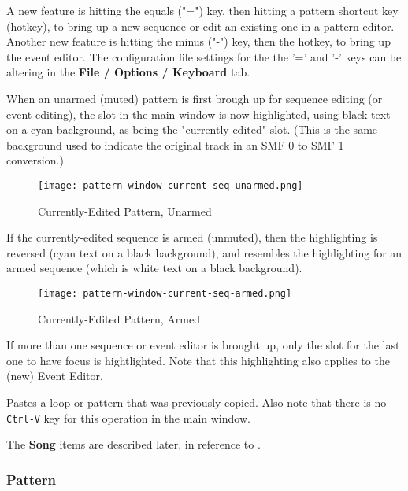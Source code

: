    A new feature is hitting the equals ("=") key, then hitting
   a pattern shortcut key (hotkey), to bring up a new sequence or edit an
   existing one in a pattern editor.  Another new feature is hitting the minus
   ("-") key, then the hotkey, to bring up the event editor.  The
   configuration file settings for the the '=' and
   '-' keys can be altering in the \textbf{File / Options / Keyboard} tab.

   When an unarmed (muted) pattern is first brough up for sequence editing (or
   event editing), the slot in the main window is now highlighted, using black
   text on a cyan background, as being the "currently-edited" slot.
   (This is the same background used to indicate the original track in an
   SMF 0 to SMF 1 conversion.)

\begin{figure}[H]
   \centering 
   \texttt{[image: pattern-window-current-seq-unarmed.png]}
   \caption{Currently-Edited Pattern, Unarmed}
   \label{fig:pattern_window_current_seq_unarmed}
\end{figure}

   If the currently-edited sequence is armed (unmuted), then the highlighting
   is reversed (cyan text on a black background), and resembles the
   highlighting for an armed sequence (which is white text on a black
   background).

\begin{figure}[H]
   \centering 
   \texttt{[image: pattern-window-current-seq-armed.png]}
   \caption{Currently-Edited Pattern, Armed}
   \label{fig:pattern_window_current_seq_armed}
\end{figure}

   If more than one sequence or event editor is brought up, only the slot for
   the last one to have focus is hightlighted.
   Note that this highlighting also applies to the (new) Event Editor.

   Pastes a loop or pattern that was previously copied.
   Also note that there is no \texttt{Ctrl-V} key for this operation in the
   main window.

   The \textbf{Song} items are described later, in reference to
   .
   
\subsubsection{Pattern}
\label{subsubsec:seq64_patterns_pattern_filled}

